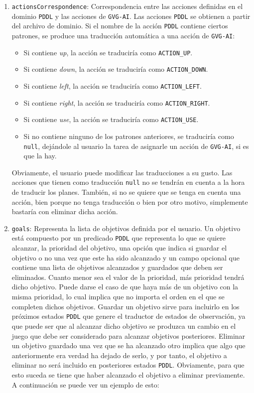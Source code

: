 \begin{enumerate}
    \item \texttt{actionsCorrespondence}: Correspondencia entre las acciones definidas en el dominio
    \texttt{PDDL} y las acciones de \texttt{GVG-AI}. Las acciones \texttt{PDDL} se obtienen
    a partir del archivo de dominio. Si el nombre de la acción \texttt{PDDL} contiene ciertos
    patrones, se produce una traducción automática a una acción de \texttt{GVG-AI}:
    
    \begin{itemize}[label=\textbullet]
        \item Si contiene \textit{up}, la acción se traduciría como \texttt{ACTION\_UP}.
        \item Si contiene \textit{down}, la acción se traduciría como \texttt{ACTION\_DOWN}.
        \item Si contiene \textit{left}, la acción se traduciría como \texttt{ACTION\_LEFT}.
        \item Si contiene \textit{right}, la acción se traduciría como \texttt{ACTION\_RIGHT}.
        \item Si contiene \textit{use}, la acción se traduciría como \texttt{ACTION\_USE}.
        \item Si no contiene ninguno de los patrones anteriores, se traduciría como \texttt{null},
        dejándole al usuario la tarea de asignarle un acción de \texttt{GVG-AI}, si es que la hay.
    \end{itemize}
    
    Obviamente, el usuario puede modificar las traducciones a su gusto. Las acciones que tienen
    como traducción \texttt{null} no se tendrán en cuenta a la hora de traducir los planes. También,
    si no se quiere que se tenga en cuenta una acción, bien porque no tenga traducción o bien por otro
    motivo, simplemente bastaría con eliminar dicha acción.
    
    \item \texttt{goals}: Representa la lista de objetivos definida por el usuario. Un objetivo está compuesto
    por un predicado \texttt{PDDL} que representa lo que se quiere alcanzar, la prioridad del objetivo, una
    opción que indica si guardar el objetivo o no una vez que este ha sido alcanzado y un campo opcional
    que contiene una lista de objetivos alcanzados y guardados que deben ser eliminados. Cuanto menor
    sea el valor de la prioridad, más prioridad tendrá dicho objetivo. Puede darse el caso de que haya
    más de un objetivo con la misma prioridad, lo cual implica que no importa el orden en el que se
    completen dichos objetivos. Guardar un objetivo sirve para incluirlo en los próximos estados \texttt{PDDL}
    que genere el traductor de estados de observación, ya que puede ser que al alcanzar dicho objetivo
    se produzca un cambio en el juego que debe ser considerado para alcanzar objetivos posteriores.
    Eliminar un objetivo guardado una vez que se ha alcanzado otro implica que algo que anteriormente
    era verdad ha dejado de serlo, y por tanto, el objetivo a eliminar no será incluido en posteriores
    estados \texttt{PDDL}. Obviamente, para que esto suceda se tiene que haber alcanzado el objetivo a
    eliminar previamente. A continuación se puede ver un ejemplo de esto:
    

\end{enumerate}
